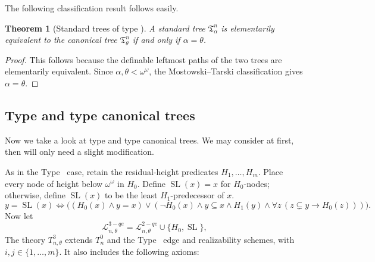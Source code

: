\documentclass{amsart}
\newtheorem{theorem}{Theorem}
\theoremstyle{definition}
\begin{document}
The following classification result follows easily.
\begin{theorem}[Standard trees of type \MakeUppercase{}]\label{thm:2-classify}
    A standard tree $\mathfrak{T}_\alpha^n$ is elementarily equivalent to the canonical tree $\mathfrak{T}_{\theta}^n$ if and only if $\alpha=\theta$.
\end{theorem}
\begin{proof}
    This follows because the definable leftmost paths of the two trees are elementarily equivalent. Since $\alpha,\theta<\omega^\omega$, the Mostowski--Tarski classification gives $\alpha=\theta$.
\end{proof}

\subsection{Type \MakeUppercase{} and type \MakeUppercase{} canonical trees}\label{sec:type34syn}

Now we take a look at type \MakeUppercase{} and type \MakeUppercase{} canonical trees. We may consider \MakeUppercase{} at first, then \MakeUppercase{} will only need a slight modification.

As in the Type~\MakeUppercase{} case, retain the residual-height predicates $H_1,\dots,H_m$. Place every node of height below $\omega^\omega$ in $H_0$. Define $\operatorname{SL}(x)=x$ for $H_0$-nodes; otherwise, define $\operatorname{SL}(x)$ to be the least $H_1$-predecessor of $x$.
$$y=\operatorname{SL}(x)\Longleftrightarrow\bigl((H_0(x)\land y=x)\lor(\neg H_0(x)\land y\subseteq x\land H_1(y)\land\forall z\,(z\subsetneq y\to H_0(z)))\bigr).$$
Now let
$$\mathcal{L}_{n,\theta}^{3-qe}=\mathcal{L}_{n,\theta}^{2-qe}\cup\{H_0,\operatorname{SL}\},$$
The theory $T_{n,\theta}^3$ extends $T_n^0$ and the Type~\MakeUppercase{} edge and realizability schemes, with $i,j\in\{1,\dots,m\}$. It also includes the following axioms:
\end{document}
